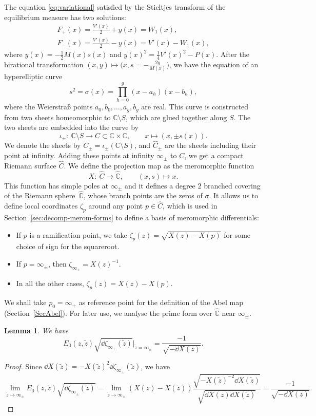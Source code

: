\documentclass[pdftex]{sigma}
\numberwithin{equation}{section}
\newtheorem{Lemma}[Theorem]{Lemma}
\newcommand{\CC}{\mathbb{C}}
\newcommand{\C}{\mathbb{C}}
\begin{document}
The equation \eqref{eq:variational} satisfied by the Stieltjes transform of the equilibrium measure has two solutions:
\begin{gather}
\nonumber
 F_{+}(x) = \frac{V'(x)}{2} + y(x) = W_{1}(x),\\
 F_{-}(x) = \frac{V'(x)}{2} - y(x) = V'(x) - W_{1}(x),\label{Fpm}
\end{gather}
where $y(x) = -\frac{1}{2}M(x)s(x)$ and $y(x)^2 = \frac{1}{4}V'(x)^2 - P(x)$. After the birational transformation $(x,y) \mapsto \bigl(x,s = -\frac{2y}{M(x)}\bigr)$, we have the equation of an hyperelliptic curve
\[
 s^{2} = \sigma(x) = \prod_{h = 0}^{g} (x - a_h)(x - b_h),
\]
where the Weierstra\ss{} points $a_0,b_0,\ldots,a_g,b_g$ are real. This curve is constructed from two sheets homeomorphic to
$\CC\setminus S$, which are glued together along $S$. The two sheets are embedded into the curve
by
\[
 \iota_{\pm }\colon \   \CC \setminus S   \longrightarrow   C \subset \CC \times \CC,\qquad  x   \longmapsto   (x,\pm s(x))  .
\]
We denote the sheets by $C_{\pm} = \iota_{\pm}(\C \setminus S)$, and $\widehat{C}_{\pm}$ are the sheets including their point at infinity. Adding these points at infinity $\infty_{\pm}$ to $C$, we get a compact Riemann surface $\widehat{C}$. We define the projection map as the meromorphic function
\[
 X \colon \  \widehat{C}   \longrightarrow   \widehat{\mathbb{C}},\qquad (x, s)   \longmapsto   x .
\]
This function has simple poles at $\infty_{\pm}$ and it defines a degree $2$ branched covering of the Riemann sphere~$\hat{\CC}$, whose branch points are the zeros of $\sigma$. It allows us to define local coordinates $\zeta_{p}$ around any point $p \in \widehat{C}$, which is used in Section~\ref{sec:decomp-merom-forms} to define a basis of meromorphic differentials:
\begin{itemize}\itemsep=0pt
 \item If $p$ is a ramification point, we take $\zeta_{p}(z) = \sqrt{X(z) - X(p)}$ for some choice of sign for the squareroot.
 \item If $p = \infty_{\pm}$, then $\zeta_{\infty_{\pm}} = X(z)^{-1}$.
 \item In all the other cases, $\zeta_{p}(z) = X(z) - X(p)$.
\end{itemize}
We shall take $p_0 = \infty_+$ as reference point for the definition of the Abel map (Section~\ref{SecAbel}). For later use, we analyse the prime form over $\widehat{\mathbb{C}}$ near $\infty_{\pm}$.
\begin{Lemma}
\label{LemE0in}We have
\[
E_0(z,\tilde{z})\sqrt{\dd \zeta_{\infty_\pm}(\tilde{z})}\Big|_{\tilde{z} = \infty_\pm} = \frac{-1}{\sqrt{-\dd X(z)}}.
\]
\end{Lemma}
\begin{proof}
Since $\dd X(\tilde{z}) = -X(\tilde{z})^2 \dd\zeta_{\infty_\pm}(\tilde{z})$, we have
\[
\lim_{\tilde{z} \rightarrow \infty_\pm} E_0(z,\tilde{z})\sqrt{\dd \zeta_{\infty_\pm}(\tilde{z})} = \lim_{\tilde{z} \rightarrow \infty_\pm} (X(z) - X(\tilde{z})) \frac{\sqrt{-X(\tilde{z})^{-2}\dd X(\tilde{z})}}{\sqrt{\dd X(z)\dd X(\tilde{z})}} = \frac{-1}{\sqrt{-\dd X(z)}}.
\tag*{\qed}
\]
\renewcommand{\qed}{}
\end{proof}
\end{document}
